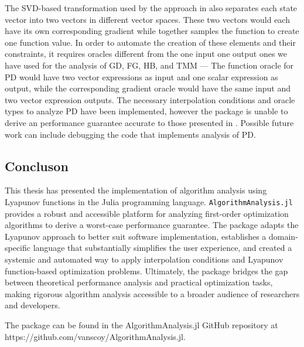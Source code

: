 The SVD-based transformation used by the approach in \cite{primaldual} also separates each state vector into two vectors in different vector spaces. These two vectors would each have its own corresponding gradient while together samples the function to create one function value. In order to automate the creation of these elements and their constraints, it requires oracles different from the one input one output ones we have used for the analysis of GD, FG, HB, and TMM --- The function oracle for PD would have two vector expressions as input and one scalar expression as output, while the corresponding gradient oracle would have the same input and two vector expression outputs. The necessary interpolation conditions and oracle types to analyze PD have been implemented, however the package is unable to derive an  performance guarantee accurate to those presented in \cite{primaldual}. Possible future work can include debugging the code that implements analysis of PD. 

\subsection*{Concluson}

This thesis has presented the implementation of algorithm analysis using Lyapunov functions in the Julia programming language. \texttt{AlgorithmAnalysis.jl} provides a robust and accessible platform for analyzing first-order optimization algorithms to derive a worst-case performance guarantee. The package adapts the Lyapunov approach to better suit software implementation, establishes a domain-specific language that substantially simplifies the user experience, and created a systemic and automated way to apply interpolation conditions and Lyapunov function-based optimization problems. Ultimately, the package bridges the gap between theoretical performance analysis and practical optimization tasks, making rigorous algorithm analysis accessible to a broader audience of researchers and developers.

The package can be found in the AlgorithmAnalysis.jl GitHub repository at https://github\allowbreak .com/vanscoy/AlgorithmAnalysis.jl.